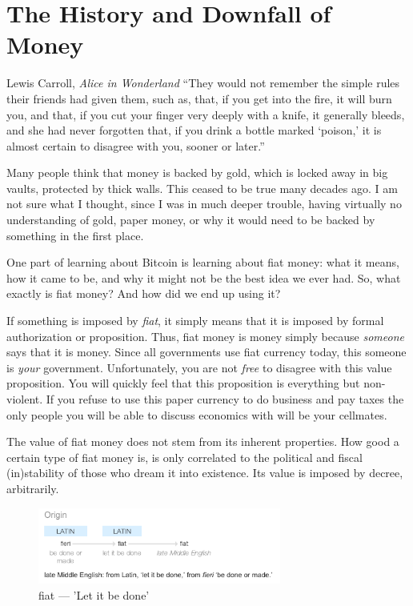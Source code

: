 \chapter{The History and Downfall of Money}
\label{les:12}

\begin{chapquote}{Lewis Carroll, \textit{Alice in Wonderland}}
\enquote{They would not remember the simple rules their friends had given them, such
as, that, if you get into the fire, it will burn you, and that, if you cut your
finger very deeply with a knife, it generally bleeds, and she had never
forgotten that, if you drink a bottle marked `poison,' it is almost certain to
disagree with you, sooner or later.}
\end{chapquote}

Many people think that money is backed by gold, which is locked away in
big vaults, protected by thick
walls. This ceased to be true many decades ago. I am not sure what I
thought, since I was in much deeper trouble, having virtually no
understanding of gold, paper money, or why it would need to be backed by
something in the first place.

One part of learning about Bitcoin is learning about fiat money: what it
means, how it came to be, and why it might not be the best idea we ever
had. So, what exactly is fiat money? And how did we end up using it?

If something is imposed by \textit{fiat}, it simply means that it is imposed by
formal authorization or proposition. Thus, fiat money is money simply
because \textit{someone} says that it is money. Since all governments use fiat
currency today, this someone is \textit{your} government. Unfortunately, you
are not \textit{free} to disagree with this value proposition. You will quickly
feel that this proposition is everything but non-violent. If you refuse
to use this paper currency to do business and pay taxes the only people
you will be able to discuss economics with will be your cellmates.

The value of fiat money does not stem from its inherent properties. How
good a certain type of fiat money is, is only correlated to the
political and fiscal (in)stability of those who dream it into existence.
Its value is imposed by decree, arbitrarily.

\begin{figure}
  \centering
  \includegraphics[width=8cm]{assets/images/fiat-definition.png}
  \caption{fiat --- 'Let it be done'}
  \label{fig:fiat-definition}
\end{figure}


